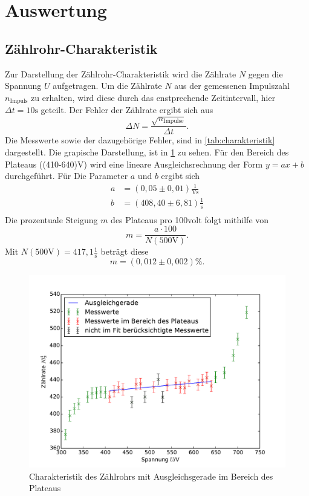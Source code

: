 \section{Auswertung}
\label{sec:Auswertung}

\subsection{Zählrohr-Charakteristik}

Zur Darstellung der Zählrohr-Charakteristik wird die Zählrate $N$ gegen die Spannung $U$ aufgetragen. Um die Zählrate $N$ aus der gemessenen Impulszahl $n_\mathrm{Impuls}$ zu erhalten, wird diese durch das enstprechende Zeitintervall, hier $\Delta t = 10\si{\second}$ geteilt. Der Fehler der Zählrate ergibt sich aus
\begin{equation}
  \label{eqn:fehler}
  \Delta N =\frac{\sqrt{n_\mathrm{Impulse}}}{\Delta t}.
\end{equation}
Die Messwerte sowie der dazugehörige Fehler, sind in \ref{tab:charakteristik} dargestellt. Die grapische Darstellung, ist in \ref{fig:plateau} zu sehen.
Für den Bereich des Plateaus ((410-640)\si{\volt}) wird eine lineare Ausgleichsrechnung der Form $y=ax+b$ durchgeführt. Für Die Parameter $a$ und $b$ ergibt sich
\begin{align}
  a&=(0,05 \pm 0,01)\frac{1}{\si{\volt\second}} \\
  b&=(408,40 \pm 6,81)\frac{1}{\si{\second}} \\
\end{align}
Die prozentuale Steigung $m$ des Plateaus pro 100\si{volt} folgt mithilfe von
\begin{equation}
  m=\frac{a\cdot 100}{N(500\si{\volt})}.
\end{equation}
Mit $N(500\si{\volt})= 417,1 \frac{1}{\si{\second}}$ beträgt diese
\begin{equation}
  m=(0,012 \pm 0,002)\%.
\end{equation}

\begin{figure}
  \centering
  \includegraphics[scale=0.8]{auswertung/plateau.pdf}
\caption{Charakteristik des Zählrohrs mit Ausgleichsgerade im Bereich des Plateaus}
  \label{fig:plateau}
\end{figure}


